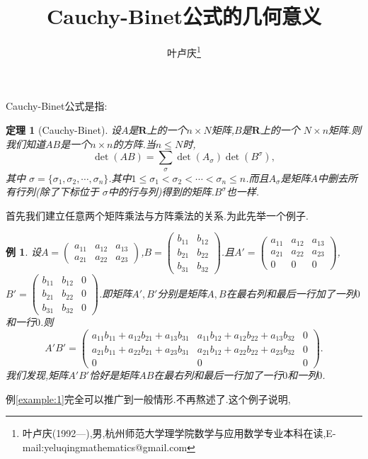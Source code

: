 \documentclass[a4paper]{article}
\newtheorem*{theo}{定理}
\newtheorem{exa}{例}
\newenvironment{theorem}
{\bigskip\begin{mdframed}\begin{theo}}
    {\end{theo}\end{mdframed}\bigskip}
\newenvironment{example}
{\bigskip\begin{mdframed}\begin{exa}}
    {\end{exa}\end{mdframed}\bigskip}
\begin{document}
\title{\huge{\bf{Cauchy-Binet公式的几何意义}}} \author{\small{叶卢庆\footnote{叶卢庆(1992---),男,杭州师范大学理学院数学与应用数学专业本科在读,E-mail:yeluqingmathematics@gmail.com}}}
\maketitle
Cauchy-Binet公式是指:
\begin{theorem}[Cauchy-Binet]
设$A$是$\mathbf{R}$上的一个$n\times N$矩阵,$B$是$\mathbf{R}$上的一个
$N\times n$矩阵.则我们知道$AB$是一个$n\times n$的方阵.当$n\leq N$时,
$$
\det(AB)=\sum_{\sigma}\det(A_{\sigma})\det(B^{\sigma}),
$$
其中
$\sigma=\{\sigma_1,\sigma_2,\cdots,\sigma_n\}$.其中$1\leq\sigma_1<\sigma_{2}<\cdots<\sigma_{n}\leq
n$.而且$A_{\sigma}$是矩阵$A$中删去所有行列(除了下标位于
$\sigma$中的行与列)得到的矩阵.$B^{\sigma}$也一样.
\end{theorem}
首先我们建立任意两个矩阵乘法与方阵乘法的关系.为此先举一个例子.
\begin{example}\label{example:1}
设$A=
\begin{pmatrix}
a_{11}&a_{12}&a_{13}\\
a_{21}&a_{22}&a_{23}
\end{pmatrix}
$,$B=
\begin{pmatrix}
  b_{11}&b_{12}\\
b_{21}&b_{22}\\
b_{31}&b_{32}
\end{pmatrix}
$.且$A'=
\begin{pmatrix}
  a_{11}&a_{12}&a_{13}\\
a_{21}&a_{22}&a_{23}\\
0&0&0
\end{pmatrix}
$,$B'=
\begin{pmatrix}
  b_{11}&b_{12}&0\\
b_{21}&b_{22}&0\\
b_{31}&b_{32}&0
\end{pmatrix}
$.即矩阵$A',B'$分别是矩阵$A,B$在最右列和最后一行加了一列$0$和一行$0$.则
$$
A'B'=
\begin{pmatrix}
a_{11}b_{11}+a_{12}b_{21}+a_{13}b_{31}&a_{11}b_{12}+a_{12}b_{22}+a_{13}b_{32}&0\\
a_{21}b_{11}+a_{22}b_{21}+a_{23}b_{31}&a_{21}b_{12}+a_{22}b_{22}+a_{23}b_{32}&0\\
0&0&0
\end{pmatrix}.
$$
我们发现,矩阵$A'B'$恰好是矩阵$AB$在最右列和最后一行加了一行$0$和一列$0$.
\end{example}
例\eqref{example:1}完全可以推广到一般情形.不再熬述了.这个例子说明,
\end{document}
